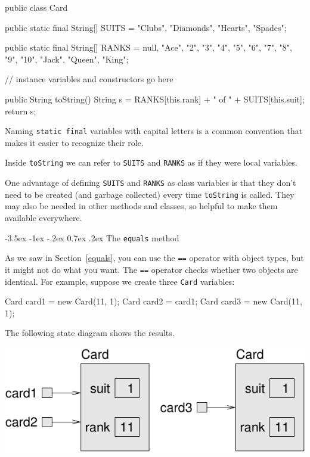 \documentclass[12pt]{book}
\makeatletter
\theoremstyle{exercise}
\newcommand{\java}[1]{\verb"#1"}
\renewcommand{\section}{\@startsection{section}{1}{\z@}%
    {-3.5ex \@plus -1ex \@minus -.2ex}%
    {0.7ex \@plus.2ex}%
    {\normalfont\Large\bfseries}}
\newcommand{\java}[1]{\lstinline{#1}} %
\makeatother
\begin{document}
\begin{code}
public class Card {

    public static final String[] SUITS = {
        "Clubs", "Diamonds", "Hearts", "Spades"};

    public static final String[] RANKS = {
        null, "Ace", "2", "3", "4", "5", "6", "7", "8", "9",
        "10", "Jack", "Queen", "King"};

    // instance variables and constructors go here

    public String toString() {
        String s = RANKS[this.rank] + " of " + SUITS[this.suit];
        return s;
    }
}
\end{code}

Naming \java{static final} variables with capital letters is a common convention that makes it easier to recognize their role.

Inside \java{toString} we can refer to \java{SUITS} and \java{RANKS} as if they were local variables.

One advantage of defining \java{SUITS} and \java{RANKS} as class variables is that they don't need to be created (and garbage collected) every time \java{toString} is called.
They may also be needed in other methods and classes, so helpful to make them available everywhere.


\section{The \java{equals} method}
\label{equivalence}

As we saw in Section~\ref{equals}, you can use the \java{==} operator with object types, but it might not do what you want.
The \java{==} operator checks whether two objects are identical.
For example, suppose we create three \java{Card} variables:


\begin{code}
    Card card1 = new Card(11, 1);
    Card card2 = card1;
    Card card3 = new Card(11, 1);
\end{code}

The following state diagram shows the results.

\begin{center}
\includegraphics{figs/card.pdf}
\end{center}
\end{document}

